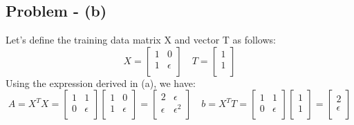 \documentclass{article}
\begin{document}
\subsection{Problem - (b)}
Let's define the training data matrix X and vector T as follows:
\[
X=\begin{bmatrix}
    1 & 0 \\
    1 & \epsilon \\
\end{bmatrix}
\hspace{1em}
T=\begin{bmatrix}
    1 \\
    1 \\
\end{bmatrix}
\]
Using the expression derived in (a), we have:
\[
A = X^{T}X=\begin{bmatrix}
    1 & 1 \\
    0 & \epsilon \\
\end{bmatrix}
\begin{bmatrix}
    1 & 0 \\
    1 & \epsilon \\
\end{bmatrix}
=
\begin{bmatrix}
    2 & \epsilon \\
    \epsilon & \epsilon^{2} \\
\end{bmatrix}
\hspace{1em}
b = X^{T}T=
\begin{bmatrix}
    1 & 1\\
    0 & \epsilon \\
\end{bmatrix}
\begin{bmatrix}
    1 \\
    1 \\
\end{bmatrix}
=
\begin{bmatrix}
    2 \\
    \epsilon \\
\end{bmatrix}
\]
\end{document}
